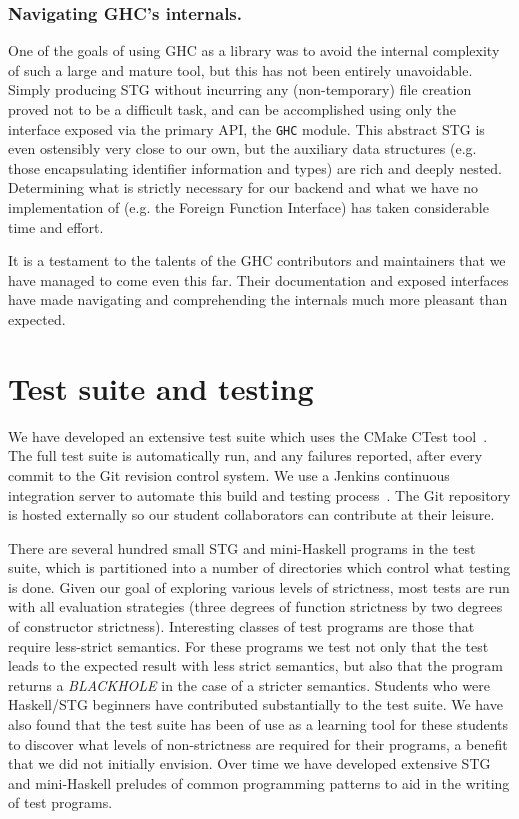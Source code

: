 \documentclass{llncs}
\begin{document}
\subsubsection{Navigating GHC's internals.}
One of the goals of using GHC as a library was to avoid
the internal complexity of such a large and mature
tool, but this has not been entirely unavoidable.  Simply producing
STG without incurring any (non-temporary) file creation proved not to
be a difficult task, and can be accomplished using only the interface
exposed via the primary API, the \texttt{GHC} module.  This abstract
STG is even ostensibly very close to our own, but the auxiliary data
structures (e.g. those encapsulating identifier information and types)
are rich and deeply nested.  Determining what is strictly necessary
for our backend and what we have no implementation of (e.g. the
Foreign Function Interface) has taken considerable time and effort.

It is a testament to the talents of the GHC contributors and
maintainers that we have managed to come even this far.  Their
documentation and exposed interfaces have made navigating and
comprehending the internals much more pleasant than expected.

\section{Test suite and testing}
\label{app:testing}
We have developed an extensive test suite which uses the CMake CTest
tool~\cite{cmake-book}. The full test suite is automatically run, and any
failures reported, after every commit to the Git revision control system. We
use a Jenkins continuous integration server to automate this build and testing
process~\cite{jenkins-book}. The Git repository is hosted externally so our
student collaborators can contribute at their leisure.

There are several hundred small STG and mini-Haskell programs in the test
suite, which is partitioned into a number of directories which control what
testing is done. Given our goal of exploring various levels of strictness,
most tests are run with all evaluation strategies (three degrees of function
strictness by two degrees of constructor strictness).  Interesting classes of
test programs are those that require less-strict semantics.  For
these programs we test not only that the test leads to the expected result
with less strict semantics, but also that the program returns a
\emph{BLACKHOLE} in the case of a stricter semantics. Students who were
Haskell/STG beginners have contributed substantially to the test suite. We
have also found that the test suite has been of use as a learning tool for
these students to discover what levels of non-strictness are required for their
programs, a benefit that we did not initially envision. Over time we have
developed extensive STG and mini-Haskell preludes of common programming
patterns to aid in the writing of test programs.
\end{document}
